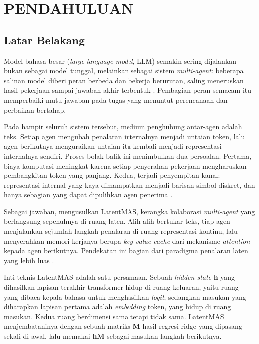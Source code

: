 \documentclass{laporanta1statugm}
\begin{document}
\cover

\newpage{}
\tableofcontents

\setcounter{page}{1}
\chapter{PENDAHULUAN}

\section{Latar Belakang}

Model bahasa besar (\textit{large language model}, LLM) semakin sering
dijalankan bukan sebagai model tunggal, melainkan sebagai sistem
\textit{multi-agent}: beberapa salinan model diberi peran berbeda dan bekerja
berurutan, saling meneruskan hasil pekerjaan sampai jawaban akhir terbentuk
\citep{russellnorvig}. Pembagian peran semacam itu memperbaiki mutu jawaban
pada tugas yang menuntut perencanaan dan perbaikan bertahap.

Pada hampir seluruh sistem tersebut, medium penghubung antar-agen adalah teks.
Setiap agen mengubah penalaran internalnya menjadi untaian token, lalu agen
berikutnya menguraikan untaian itu kembali menjadi representasi internalnya
sendiri. Proses bolak-balik ini menimbulkan dua persoalan. Pertama, biaya
komputasi meningkat karena setiap penyerahan pekerjaan mengharuskan
pembangkitan token yang panjang. Kedua, terjadi penyempitan kanal: representasi
internal yang kaya dimampatkan menjadi barisan simbol diskret, dan hanya
sebagian yang dapat dipulihkan agen penerima \citep{latentmas, cache2cache}.

Sebagai jawaban, \citet{latentmas} mengusulkan LatentMAS, kerangka kolaborasi
\textit{multi-agent} yang berlangsung sepenuhnya di ruang laten. Alih-alih
bertukar teks, tiap agen menjalankan sejumlah langkah penalaran di ruang
representasi kontinu, lalu menyerahkan memori kerjanya berupa
\textit{key-value cache} dari mekanisme \textit{attention} \citep{vaswani}
kepada agen berikutnya. Pendekatan ini bagian dari paradigma penalaran laten
yang lebih luas \citep{coconut, latentsurvey}.

Inti teknis LatentMAS adalah satu persamaan. Sebuah \textit{hidden state}
$\bm{h}$ yang dihasilkan lapisan terakhir transformer hidup di ruang keluaran,
yaitu ruang yang dibaca kepala bahasa untuk menghasilkan \textit{logit};
sedangkan masukan yang diharapkan lapisan pertama adalah \textit{embedding}
token, yang hidup di ruang masukan. Kedua ruang berdimensi sama tetapi tidak
sama. LatentMAS menjembataninya dengan sebuah matriks $\bm{M}$ hasil regresi
ridge \citep{ridge} yang dipasang sekali di awal, lalu memakai $\bm{h}\bm{M}$
sebagai masukan langkah berikutnya.
\end{document}
